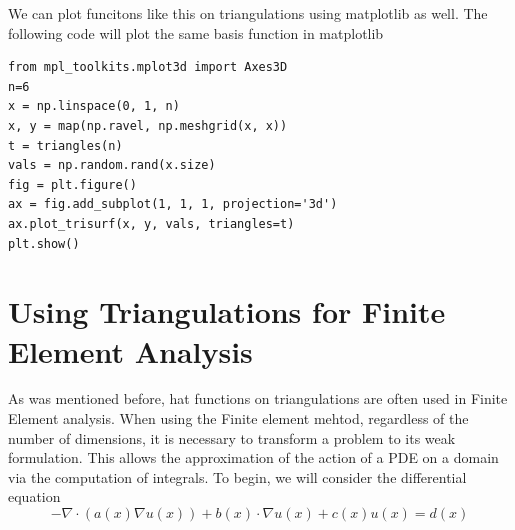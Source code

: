We can plot funcitons like this on triangulations using matplotlib as well.
The following code will plot the same basis function in matplotlib
\begin{lstlisting}
from mpl_toolkits.mplot3d import Axes3D
n=6
x = np.linspace(0, 1, n)
x, y = map(np.ravel, np.meshgrid(x, x))
t = triangles(n)
vals = np.random.rand(x.size)
fig = plt.figure()
ax = fig.add_subplot(1, 1, 1, projection='3d')
ax.plot_trisurf(x, y, vals, triangles=t)
plt.show()
\end{lstlisting}

\section*{Using Triangulations for Finite Element Analysis}

As was mentioned before, hat functions on triangulations are often used in Finite Element analysis.
When using the Finite element mehtod, regardless of the number of dimensions, it is necessary to transform a problem to its weak formulation.
This allows the approximation of the action of a PDE on a domain via the computation of integrals.
To begin, we will consider the differential equation
\[-\nabla \cdot \left(a\left(x\right) \nabla u\left(x\right)\right) + b\left(x\right) \cdot \nabla u\left(x\right) + c\left(x\right) u\left(x\right) = d\left(x\right)\]
